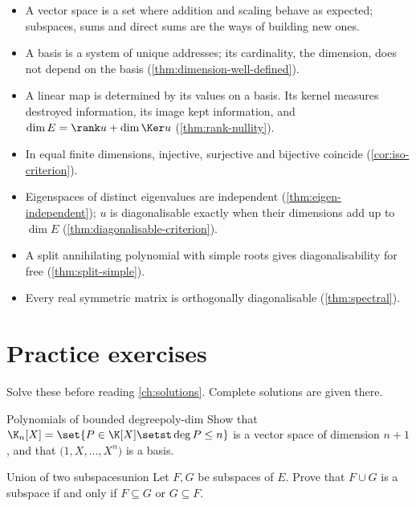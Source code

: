 \begin{summarybox}
\begin{itemize}
  \item A vector space is a set where addition and scaling behave as expected;
        subspaces, sums and direct sums are the ways of building new ones.
  \item A basis is a system of unique addresses; its cardinality, the dimension,
        does not depend on the basis (\cref{thm:dimension-well-defined}).
  \item A linear map is determined by its values on a basis. Its kernel measures
        destroyed information, its image kept information, and
        $\dim E=\rank u+\dim\Ker u$ (\cref{thm:rank-nullity}).
  \item In equal finite dimensions, injective, surjective and bijective coincide
        (\cref{cor:iso-criterion}).
  \item Eigenspaces of distinct eigenvalues are independent
        (\cref{thm:eigen-independent}); $u$ is diagonalisable exactly when their
        dimensions add up to $\dim E$ (\cref{thm:diagonalisable-criterion}).
  \item A split annihilating polynomial with simple roots gives diagonalisability
        for free (\cref{thm:split-simple}).
  \item Every real symmetric matrix is orthogonally diagonalisable
        (\cref{thm:spectral}).
\end{itemize}
\end{summarybox}

\section{Practice exercises}

Solve these before reading \cref{ch:solutions}. Complete solutions are given
there.

\begin{exercise}{Polynomials of bounded degree}{poly-dim}
Show that $\K_{n}[X]=\set{P\in\K[X]\setst\deg P\leq n}$ is a vector space of
dimension $n+1$, and that $\bigl(1,X,\dots,X^{n}\bigr)$ is a basis.
\end{exercise}

\begin{exercise}{Union of two subspaces}{union}
Let $F,G$ be subspaces of $E$. Prove that $F\cup G$ is a subspace if and only if
$F\subseteq G$ or $G\subseteq F$.
\end{exercise}

